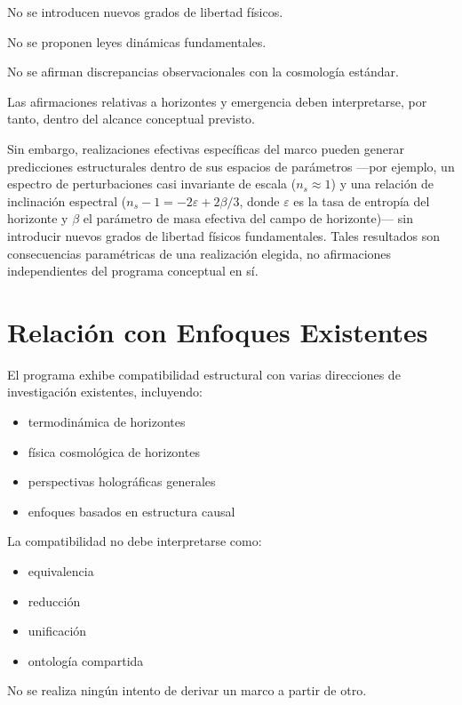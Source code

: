 \documentclass[12pt,a4paper]{article}
\begin{document}
No se introducen nuevos grados de libertad físicos.

No se proponen leyes dinámicas fundamentales.

No se afirman discrepancias observacionales con la cosmología estándar.

Las afirmaciones relativas a horizontes y emergencia deben interpretarse, por tanto, dentro del alcance conceptual previsto.

Sin embargo, realizaciones efectivas específicas del marco pueden generar predicciones estructurales dentro de sus espacios de parámetros ---por ejemplo, un espectro de perturbaciones casi invariante de escala ($n_s \approx 1$) y una relación de inclinación espectral ($n_s - 1 = -2\varepsilon + 2\beta/3$, donde $\varepsilon$ es la tasa de entropía del horizonte y $\beta$ el parámetro de masa efectiva del campo de horizonte)--- sin introducir nuevos grados de libertad físicos fundamentales. Tales resultados son consecuencias paramétricas de una realización elegida, no afirmaciones independientes del programa conceptual en sí.

\section{Relación con Enfoques Existentes}

El programa exhibe compatibilidad estructural con varias direcciones de investigación existentes, incluyendo:

\begin{itemize}
  \item termodinámica de horizontes
  \item física cosmológica de horizontes
  \item perspectivas holográficas generales
  \item enfoques basados en estructura causal
\end{itemize}

La compatibilidad no debe interpretarse como:

\begin{itemize}
  \item equivalencia
  \item reducción
  \item unificación
  \item ontología compartida
\end{itemize}

No se realiza ningún intento de derivar un marco a partir de otro.
\end{document}
